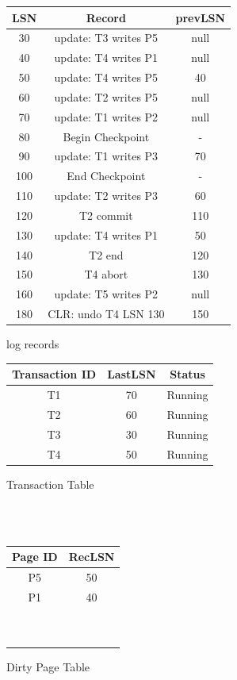 \documentclass[paper=a4, fontsize=11pt]{scrartcl}
\numberwithin{equation}{section}		%
\numberwithin{figure}{section}			%
\numberwithin{table}{section}				%
\begin{document}
\begin{minipage}{\textwidth}
\begin{minipage}[t]{0.6\textwidth}

\makeatletter{}
\centering
    \begin{tabular}{|c|c|c|}
    \hline
        \textbf{LSN} & \textbf{Record} & \textbf{prevLSN} \\ \hline
        30 & update: T3 writes P5 & null \\ \hline
        40 & update: T4 writes P1 & null \\ \hline
        50 & update: T4 writes P5 & 40 \\ \hline
        60 & update: T2 writes P5 & null \\ \hline
        70 & update: T1 writes P2 & null \\ \hline
        80 & Begin Checkpoint & - \\ \hline
        90 & update: T1 writes P3 & 70 \\ \hline
        100 & End Checkpoint  & - \\ \hline
        110 & update: T2 writes P3 & 60 \\ \hline
        120 & T2 commit & 110 \\ \hline
        130 & update: T4 writes P1 & 50 \\ \hline
        140 & T2 end & 120 \\ \hline
        150 & T4 abort & 130 \\ \hline
        160 & update: T5 writes P2 & null \\ \hline
        180 & CLR: undo T4 LSN 130 & 150 \\ \hline
    \end{tabular}
    \caption{log records}
\label{record}
\end{minipage}
\begin{minipage}[t]{0.48\textwidth}
\makeatletter{}
\centering
\begin{tabular}{|c|c|c|}
\hline
    \textbf{Transaction ID} & \textbf{LastLSN} & \textbf{Status} \\ \hline
    T1 & 70 & Running \\ \hline
    T2 & 60 & Running \\ \hline
    T3 & 30 & Running \\ \hline
    T4 & 50 & Running \\ \hline
\end{tabular}
\caption{Transaction Table}
\\~\\
\label{sample-1}
\begin{tabular}{|c|c|}
\hline
    \textbf{Page ID} & \textbf{RecLSN} \\ \hline
    P5 & 50 \\ \hline
    P1 & 40 \\ \hline
    ~ & ~ \\ \hline
    ~ & ~ \\ \hline
\end{tabular}
\caption{Dirty Page Table}
\label{sample-2}
\end{minipage}
\end{minipage}
\end{document}
